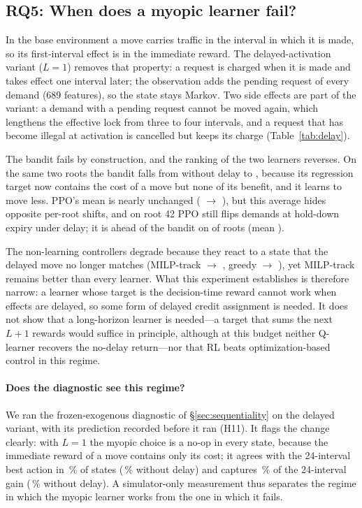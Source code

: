 \subsection{RQ5: When does a myopic learner fail?}
\label{sec:rq5}

In the base environment a move carries traffic in the interval in which it is
made, so its first-interval effect is in the immediate reward. The
delayed-activation variant ($L=1$) removes that property: a request is
charged when it is made and takes effect one interval later; the observation
adds the pending request of every demand (689 features), so the state stays
Markov. Two side effects are part of the variant: a demand with a pending
request cannot be moved again, which lengthens the effective lock from three
to four intervals, and a request that has become illegal at activation is
cancelled but keeps its charge (Table~\ref{tab:delay}).

The bandit fails by construction, and the ranking of the two learners
reverses. On the same two roots the bandit falls from \DelayBanditLZero{}
without delay to \DelayBandit{}, because its regression target now contains
the cost of a move but none of its benefit, and it learns to move less. PPO's
mean is nearly unchanged (\DelayPPOLZero{} $\rightarrow$ \DelayPPO), but this
average hides opposite per-root shifts, and on root 42 PPO still flips demands
at hold-down expiry under delay; it is ahead of the bandit on
\DelayPPORootsBetter{} of \DelayPPORoots{} roots (mean \DelayPPOVs).

The non-learning controllers degrade because they react to a state that the
delayed move no longer matches (MILP-track \DelayRefmilptrackLZero{}
$\rightarrow$ \DelayRefmilptrack, greedy \DelayRefgreedyLZero{} $\rightarrow$
\DelayRefgreedy), yet MILP-track remains better than every learner. What this
experiment establishes is therefore narrow: a learner whose target is the
decision-time reward cannot work when effects are delayed, so some form of
delayed credit assignment is needed. It does not show that a long-horizon
learner is needed---a target that sums the next $L+1$ rewards would suffice
in principle, although at this budget neither Q-learner recovers the
no-delay return---nor that RL beats optimization-based control in this
regime.

\paragraph{Does the diagnostic see this regime?} We ran the frozen-exogenous
diagnostic of \S\ref{sec:sequentiality} on the delayed variant, with its
prediction recorded before it ran (H11). It flags the change clearly: with $L=1$ the
myopic choice is a no-op in every state, because the immediate reward of a
move contains only its cost; it agrees with the 24-interval best action in
\SeqDelayFrozenAgreeHTwentyFour\,\% of states (\SeqFrozenAgreeHTwentyFour\,\%
without delay) and captures \SeqDelayFrozenCapturedHTwentyFour\,\% of the
24-interval gain (\SeqFrozenCapturedHTwentyFour\,\% without delay). A
simulator-only measurement thus separates the regime in which the myopic
learner works from the one in which it fails.

